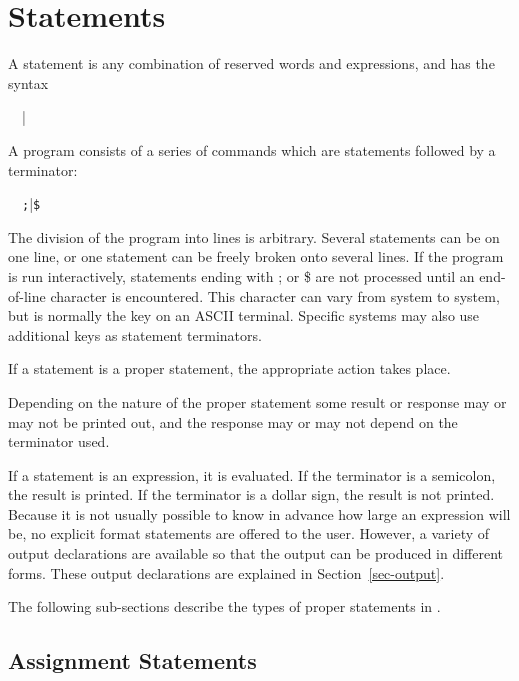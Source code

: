 \chapter{Statements}

A statement is any combination of reserved words and
expressions, and has the syntax 
\begin{syntax}
  \ \BNFprod\ |
\end{syntax}
A {\REDUCE} program consists of a series of commands which are statements
followed by a terminator:
\begin{syntax}
  \ \BNFprod\ \texttt{;}|\texttt{\$}
\end{syntax}
The division of the program into lines is arbitrary. Several statements
can be on one line, or one statement can be freely broken onto several
lines. If the program is run interactively, statements ending with ; or \$
are not processed until an end-of-line character is encountered. This
character can vary from system to system, but is normally the 
key on an ASCII terminal.  Specific systems may also use additional keys
as statement terminators.

If a statement is a proper statement, the
appropriate action takes place.

Depending on the nature of the proper statement some result or response may
or may not be printed out, and the response may or may not depend on the
terminator used.

If a statement is an expression, it is evaluated. If the terminator is a
semicolon, the result is printed. If the terminator is a dollar sign, the
result is not printed. Because it is not usually possible to know in
advance how large an expression will be, no explicit format statements are
offered to the user. However, a variety of output declarations are
available so that the output can be produced in different forms. These
output declarations are explained in Section~\ref{sec-output}.

The following sub-sections describe the types of proper statements
 in {\REDUCE}.

\hypertarget{reserved:assignop}{\section{Assignment Statements}}

